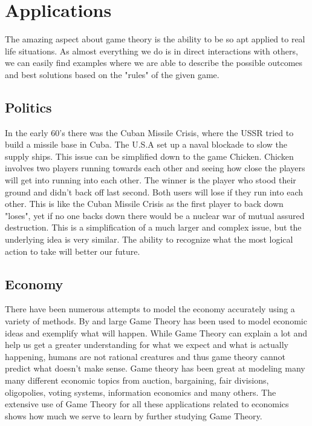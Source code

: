 \documentclass[12pt]{article}
\begin{document}
 	\section{Applications}
 		The amazing aspect about game theory is the ability to be so apt applied to real life situations. As almost everything we do is in direct interactions with others, we can easily find examples where we are able to describe the possible outcomes and best solutions based on the "rules" of the given game.
 		\subsection{Politics}
 		In the early 60's there was the Cuban Missile Crisis, where the USSR tried to build a missile base in Cuba. The U.S.A set up a naval blockade to slow the supply ships. This issue can be simplified down to the game Chicken. Chicken involves two players running towards each other and seeing how close the players will get into running into each other. The winner is the player who stood their ground and didn't back off last second. Both users will lose if they run into each other. This is like the Cuban Missile Crisis as the first player to back down "loses", yet if no one backs down there would be a nuclear war of mutual assured destruction. This is a simplification of a much larger and complex issue, but the underlying idea is very similar. The ability to recognize what the most logical action to take will better our future.
 		
 		\subsection{Economy}
 		There have been numerous attempts to model the economy accurately using a variety of methods. By and large Game Theory has been used to model economic ideas and exemplify what will happen. While Game Theory can explain a lot and help us get a greater understanding for what we expect and what is actually happening, humans are not rational creatures and thus game theory cannot predict what doesn't make sense. Game theory has been great at modeling many many different economic topics from auction, bargaining, fair divisions, oligopolies, voting systems, information economics and many others. The extensive use of Game Theory for all these applications related to economics shows how much we serve to learn by further studying Game Theory.
\end{document}
